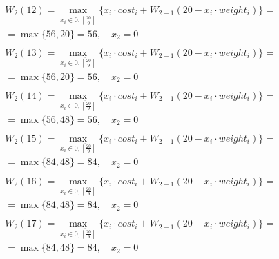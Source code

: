 \documentclass[17pt]{extarticle}
\begin{document}
\[
    \begin{aligned}
         & W_2(12)=\max_{x_i \in \overline{0, \left[\frac{20}{9}\right]}} \{x_i \cdot cost_i + W_{2-1}(20 - x_i \cdot weight_i)\}= \\& = \max \{
        56, 20\}= 56, \quad x_2 = 0                                                                                                \\
    \end{aligned}
\]
\[
    \begin{aligned}
         & W_2(13)=\max_{x_i \in \overline{0, \left[\frac{20}{9}\right]}} \{x_i \cdot cost_i + W_{2-1}(20 - x_i \cdot weight_i)\}= \\& = \max \{
        56, 20\}= 56, \quad x_2 = 0                                                                                                \\
    \end{aligned}
\]
\[
    \begin{aligned}
         & W_2(14)=\max_{x_i \in \overline{0, \left[\frac{20}{9}\right]}} \{x_i \cdot cost_i + W_{2-1}(20 - x_i \cdot weight_i)\}= \\& = \max \{
        56, 48\}= 56, \quad x_2 = 0                                                                                                \\
    \end{aligned}
\]
\[
    \begin{aligned}
         & W_2(15)=\max_{x_i \in \overline{0, \left[\frac{20}{9}\right]}} \{x_i \cdot cost_i + W_{2-1}(20 - x_i \cdot weight_i)\}= \\& = \max \{
        84, 48\}= 84, \quad x_2 = 0                                                                                                \\
    \end{aligned}
\]
\[
    \begin{aligned}
         & W_2(16)=\max_{x_i \in \overline{0, \left[\frac{20}{9}\right]}} \{x_i \cdot cost_i + W_{2-1}(20 - x_i \cdot weight_i)\}= \\& = \max \{
        84, 48\}= 84, \quad x_2 = 0                                                                                                \\
    \end{aligned}
\]
\[
    \begin{aligned}
         & W_2(17)=\max_{x_i \in \overline{0, \left[\frac{20}{9}\right]}} \{x_i \cdot cost_i + W_{2-1}(20 - x_i \cdot weight_i)\}= \\& = \max \{
        84, 48\}= 84, \quad x_2 = 0                                                                                                \\
    \end{aligned}
\]
\end{document}
